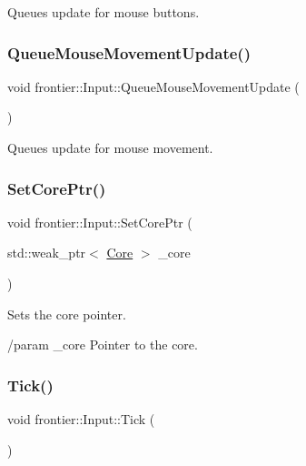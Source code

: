 Queues update for mouse buttons. 

\mbox{\label{classfrontier_1_1_input_adad2b084e3ddc0ddcf6db9d6f5ebf307}} 
\subsubsection{\texorpdfstring{Queue\+Mouse\+Movement\+Update()}{QueueMouseMovementUpdate()}}
{\footnotesize\ttfamily void frontier\+::\+Input\+::\+Queue\+Mouse\+Movement\+Update (\begin{DoxyParamCaption}{ }\end{DoxyParamCaption})}



Queues update for mouse movement. 

\mbox{\label{classfrontier_1_1_input_a5ce39c7eaf92aef7ea316483d797caf6}} 
\subsubsection{\texorpdfstring{Set\+Core\+Ptr()}{SetCorePtr()}}
{\footnotesize\ttfamily void frontier\+::\+Input\+::\+Set\+Core\+Ptr (\begin{DoxyParamCaption}\item[{std\+::weak\+\_\+ptr$<$ \hyperlink{classfrontier_1_1_core}{Core} $>$}]{\+\_\+core }\end{DoxyParamCaption})}



Sets the core pointer. 

/param \+\_\+core Pointer to the core. \mbox{\label{classfrontier_1_1_input_ab3d78d816a9ae5ed02c9c91900097149}} 
\subsubsection{\texorpdfstring{Tick()}{Tick()}}
{\footnotesize\ttfamily void frontier\+::\+Input\+::\+Tick (\begin{DoxyParamCaption}{ }\end{DoxyParamCaption})}



